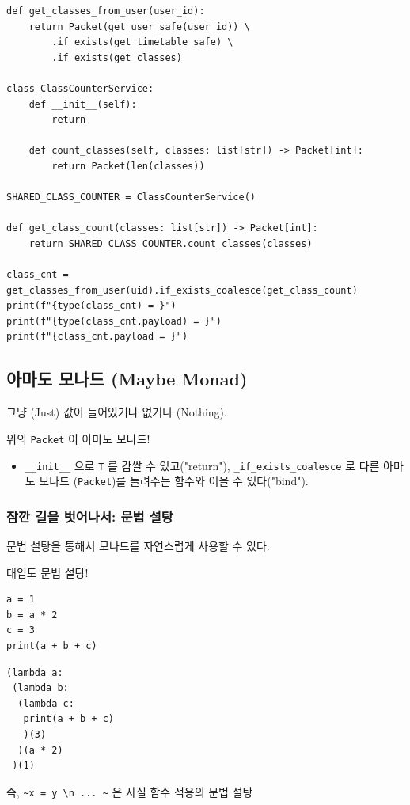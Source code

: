 \documentclass[a4paper,11pt]{article}
\begin{document}
\begin{verbatim}
def get_classes_from_user(user_id):
    return Packet(get_user_safe(user_id)) \
        .if_exists(get_timetable_safe) \
        .if_exists(get_classes)

class ClassCounterService:
    def __init__(self):
        return

    def count_classes(self, classes: list[str]) -> Packet[int]:
        return Packet(len(classes))

SHARED_CLASS_COUNTER = ClassCounterService()

def get_class_count(classes: list[str]) -> Packet[int]:
    return SHARED_CLASS_COUNTER.count_classes(classes)

class_cnt = get_classes_from_user(uid).if_exists_coalesce(get_class_count)
print(f"{type(class_cnt) = }")
print(f"{type(class_cnt.payload) = }")
print(f"{class_cnt.payload = }")
\end{verbatim}

\subsection{아마도 모나드 (Maybe Monad)}
\label{sec:org3a429be}
그냥 (Just) 값이 들어있거나 없거나 (Nothing).

위의 \texttt{Packet} 이 아마도 모나드!
\begin{itemize}
\item \texttt{\_\_init\_\_} 으로 \texttt{T} 를 감쌀 수 있고("return"), \texttt{\_if\_exists\_coalesce} 로 다른 아마도 모나드 (\texttt{Packet})를 돌려주는 함수와 이을 수 있다("bind").
\end{itemize}

\subsubsection{잠깐 길을 벗어나서: 문법 설탕}
\label{sec:org9c6ce68}
문법 설탕을 통해서 모나드를 자연스럽게 사용할 수 있다.

대입도 문법 설탕!
\begin{verbatim}
a = 1
b = a * 2
c = 3
print(a + b + c)
\end{verbatim}

\begin{verbatim}
(lambda a:
 (lambda b:
  (lambda c:
   print(a + b + c)
   )(3)
  )(a * 2)
 )(1)
\end{verbatim}

즉, \texttt{\textasciitilde{}x = y \textbackslash{}n ... \textasciitilde{}} 은 사실 함수 적용의 문법 설탕
\end{document}
